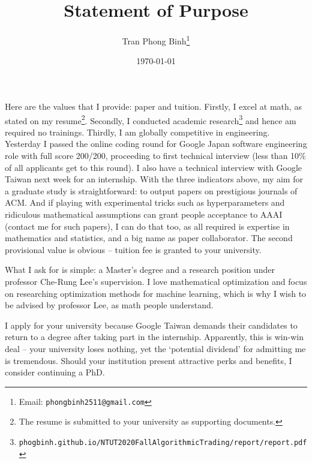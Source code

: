 \documentclass[12pt, letterpaper, oneside]{article}
\title{\textbf{Statement of Purpose}}
\author{Tran Phong Binh\thanks{Email: \texttt{phongbinh2511@gmail.com}}}
\date{\today}
\begin{document}
\maketitle

Here are the values that I provide: paper and tuition. Firstly, I excel at math, as stated on my resume\footnote{The resume is submitted to your university as supporting documents.}. Secondly, I conducted academic research\footnote{\texttt{phogbinh.github.io/NTUT2020FallAlgorithmicTrading/report/report.pdf}} and hence am required no trainings. Thirdly, I am globally competitive in engineering. Yesterday I passed the online coding round for Google Japan software engineering role with full score 200/200, proceeding to first technical interview (less than 10\% of all applicants get to this round). I also have a technical interview with Google Taiwan next week for an internship. With the three indicators above, my aim for a graduate study is straightforward: to output papers on prestigious journals of ACM. And if playing with experimental tricks such as hyperparameters and ridiculous mathematical assumptions can grant people acceptance to AAAI (contact me for such papers), I can do that too, as all required is expertise in mathematics and statistics, and a big name as paper collaborator. The second provisional value is obvious -- tuition fee is granted to your university.

What I ask for is simple: a Master's degree and a research position under professor Che-Rung Lee's supervision. I love mathematical optimization and focus on researching optimization methods for machine learning, which is why I wish to be advised by professor Lee, as math people understand.

I apply for your university because Google Taiwan demands their candidates to return to a degree after taking part in the internship. Apparently, this is win-win deal -- your university loses nothing, yet the `potential dividend' for admitting me is tremendous. Should your institution present attractive perks and benefits, I consider continuing a PhD.
\end{document}
